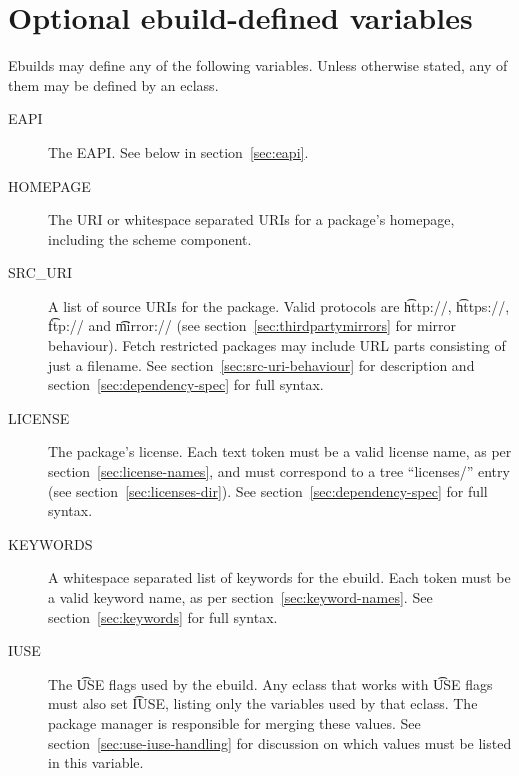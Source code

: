 \section{Optional ebuild-defined variables}
\label{sec:optional-vars}

Ebuilds may define any of the following variables. Unless otherwise stated, any of them may be
defined by an eclass.

\begin{description}
\item[EAPI] The EAPI\@. See below in section~\ref{sec:eapi}.
\item[HOMEPAGE] The URI or whitespace separated URIs for a package's homepage, including the scheme
    component.
\item[SRC_URI] A list of source URIs for the package. Valid protocols are \t{http://},
    \t{https://}, \t{ftp://} and \t{mirror://} (see section~\ref{sec:thirdpartymirrors} for mirror
    behaviour). Fetch restricted packages may include URL parts consisting of just a filename.
    See section~\ref{sec:src-uri-behaviour} for description and section~\ref{sec:dependency-spec}
    for full syntax.
\item[LICENSE] The package's license. Each text token must be a valid license name, as per
    section~\ref{sec:license-names}, and must correspond to a tree ``licenses/'' entry
    (see section~\ref{sec:licenses-dir}). See section~\ref{sec:dependency-spec} for full syntax.
\item[KEYWORDS] A whitespace separated list of keywords for the ebuild. Each token must be a valid
    keyword name, as per section~\ref{sec:keyword-names}. See section~\ref{sec:keywords} for full
    syntax.
\item[IUSE] The \t{USE} flags used by the ebuild. Any eclass that works with \t{USE} flags must
    also set \t{IUSE}, listing only the variables used by that eclass. The package manager is
    responsible for merging these values. See section~\ref{sec:use-iuse-handling} for discussion on
    which values must be listed in this variable.


\end{description}

